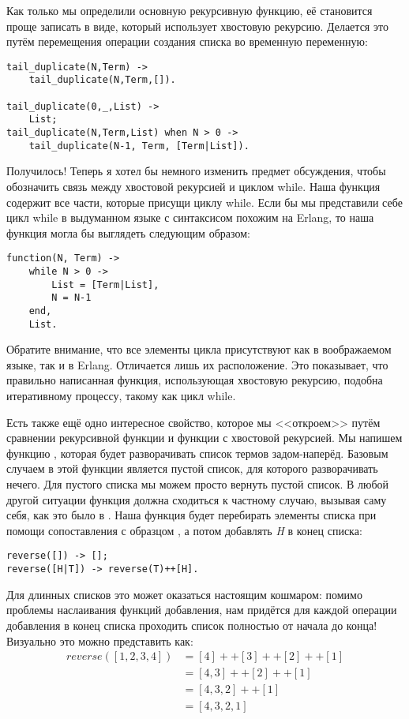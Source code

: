 Как только мы определили основную рекурсивную функцию, её становится проще записать в виде, который использует хвостовую рекурсию.
Делается это путём перемещения операции создания списка во временную переменную:
\begin{lstlisting}[style=erlang]
tail_duplicate(N,Term) ->
    tail_duplicate(N,Term,[]).
 
tail_duplicate(0,_,List) ->
    List;
tail_duplicate(N,Term,List) when N > 0 ->
    tail_duplicate(N-1, Term, [Term|List]).
\end{lstlisting}

Получилось!
Теперь я хотел бы немного изменить предмет обсуждения, чтобы обозначить связь между хвостовой рекурсией и циклом while.
Наша функция  содержит все части, которые присущи циклу while.
Если бы мы представили себе цикл while в выдуманном языке с синтаксисом похожим на Erlang, то наша функция могла бы выглядеть следующим образом:
\begin{lstlisting}[style=erlang]
function(N, Term) ->
    while N > 0 ->
        List = [Term|List],
        N = N-1
    end,
    List.
\end{lstlisting}

Обратите внимание, что все элементы цикла присутствуют как в воображаемом языке, так и в Erlang.
Отличается лишь их расположение.
Это показывает, что правильно написанная функция, использующая хвостовую рекурсию, подобна итеративному процессу, такому как цикл while.

Есть также ещё одно интересное свойство, которое мы <<откроем>> путём сравнении рекурсивной функции и функции с хвостовой рекурсией.
Мы напишем функцию , которая будет разворачивать список термов задом\--наперёд.
Базовым случаем в этой функции является пустой список, для которого разворачивать нечего.
Для пустого списка мы можем просто вернуть пустой список.
В любой другой ситуации функция должна сходиться к частному случаю, вызывая саму себя, как это было в .
Наша функция будет перебирать элементы списка при помощи сопоставления с образцом \ops{H|T]}, а потом добавлять \emph{H} в конец списка:
\begin{lstlisting}[style=erlang]
reverse([]) -> [];
reverse([H|T]) -> reverse(T)++[H].
\end{lstlisting}

Для длинных списков это может оказаться настоящим кошмаром: помимо проблемы наслаивания функций добавления, нам придётся для каждой операции добавления в конец списка проходить список полностью от начала до конца!
Визуально это можно представить как:
\begin{align*}
reverse([1,2,3,4]) &= [4]++[3]++[2]++[1]\\
&= [4,3]++[2]++[1]\\
&= [4,3,2]++[1]\\
&= [4,3,2,1]\\
\end{align*}

